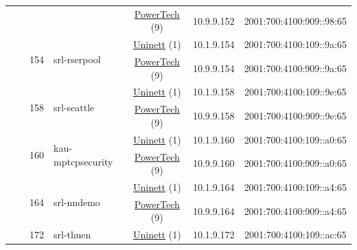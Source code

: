 \begin{small}
\begin{center}
\begin{longtable}{|c|c|c|c|c|c|c|c|}
  &  &  &  & \multicolumn{2}{|c|}{\tiny{\href{http://www.powertech.no}{PowerTech} (9)}} & \tiny{10.9.9.152} & \tiny{2001:700:4100:909::98:65} \\* \cline{3-3}\cline{4-4}\cline{5-5}\cline{6-6}\cline{7-7}\cline{8-8}
  &  & \multirow{2}{*}{\tiny{154}} & \multicolumn{1}{|l|}{\multirow{2}{*}{\tiny{srl-rserpool}}} & \multicolumn{2}{|c|}{\tiny{\href{https://www.uninett.no}{Uninett} (1)}} & \tiny{10.1.9.154} & \tiny{2001:700:4100:109::9a:65} \\* \cline{5-5}\cline{6-6}\cline{7-7}\cline{8-8}
  &  &  &  & \multicolumn{2}{|c|}{\tiny{\href{http://www.powertech.no}{PowerTech} (9)}} & \tiny{10.9.9.154} & \tiny{2001:700:4100:909::9a:65} \\* \cline{3-3}\cline{4-4}\cline{5-5}\cline{6-6}\cline{7-7}\cline{8-8}
  &  & \multirow{2}{*}{\tiny{158}} & \multicolumn{1}{|l|}{\multirow{2}{*}{\tiny{srl-seattle}}} & \multicolumn{2}{|c|}{\tiny{\href{https://www.uninett.no}{Uninett} (1)}} & \tiny{10.1.9.158} & \tiny{2001:700:4100:109::9e:65} \\* \cline{5-5}\cline{6-6}\cline{7-7}\cline{8-8}
  &  &  &  & \multicolumn{2}{|c|}{\tiny{\href{http://www.powertech.no}{PowerTech} (9)}} & \tiny{10.9.9.158} & \tiny{2001:700:4100:909::9e:65} \\* \cline{3-3}\cline{4-4}\cline{5-5}\cline{6-6}\cline{7-7}\cline{8-8}
  &  & \multirow{2}{*}{\tiny{160}} & \multicolumn{1}{|l|}{\multirow{2}{*}{\tiny{kau-mptcpsecurity}}} & \multicolumn{2}{|c|}{\tiny{\href{https://www.uninett.no}{Uninett} (1)}} & \tiny{10.1.9.160} & \tiny{2001:700:4100:109::a0:65} \\* \cline{5-5}\cline{6-6}\cline{7-7}\cline{8-8}
  &  &  &  & \multicolumn{2}{|c|}{\tiny{\href{http://www.powertech.no}{PowerTech} (9)}} & \tiny{10.9.9.160} & \tiny{2001:700:4100:909::a0:65} \\* \cline{3-3}\cline{4-4}\cline{5-5}\cline{6-6}\cline{7-7}\cline{8-8}
  &  & \multirow{2}{*}{\tiny{164}} & \multicolumn{1}{|l|}{\multirow{2}{*}{\tiny{srl-nndemo}}} & \multicolumn{2}{|c|}{\tiny{\href{https://www.uninett.no}{Uninett} (1)}} & \tiny{10.1.9.164} & \tiny{2001:700:4100:109::a4:65} \\* \cline{5-5}\cline{6-6}\cline{7-7}\cline{8-8}
  &  &  &  & \multicolumn{2}{|c|}{\tiny{\href{http://www.powertech.no}{PowerTech} (9)}} & \tiny{10.9.9.164} & \tiny{2001:700:4100:909::a4:65} \\* \cline{3-3}\cline{4-4}\cline{5-5}\cline{6-6}\cline{7-7}\cline{8-8}
  &  & \multirow{2}{*}{\tiny{172}} & \multicolumn{1}{|l|}{\multirow{2}{*}{\tiny{srl-thuen}}} & \multicolumn{2}{|c|}{\tiny{\href{https://www.uninett.no}{Uninett} (1)}} & \tiny{10.1.9.172} & \tiny{2001:700:4100:109::ac:65} \\* \cline{5-5}\cline{6-6}\cline{7-7}\cline{8-8}

\end{longtable}
\end{center}
\end{small}
